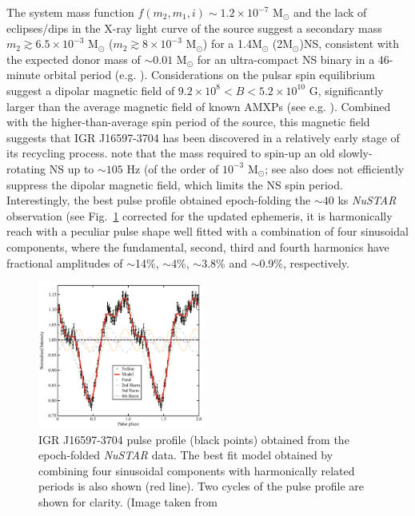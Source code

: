 \documentclass[graybox]{svmult}
\def \nustar{{\em NuSTAR\xspace}}
\begin{document}
The system mass function $f(m_2 ,m_1 ,i)\sim 1.2\times 10^{-7}$ M$_\odot$ and the lack of eclipses/dips in the X-ray light curve of the source suggest a secondary mass $m_2\gtrsim6.5\times 10^{-3}$ M$_\odot$ ($m_2\gtrsim8\times 10^{-3}$ M$_\odot$) for a 1.4M$_\odot$ (2M$_
\odot$)NS, consistent with the expected donor mass of $\sim0.01$ M$_\odot$ for an ultra-compact NS binary in a 46-minute orbital period (e.g. \cite{vanHaaften2012}). Considerations on the pulsar spin equilibrium suggest a dipolar magnetic field of $9.2\times 10^{8} < B < 5.2\times 10^{10}$ G, significantly larger than the average magnetic field of known AMXPs (see e.g. \cite{Mukherjee2015, Degenaar2017}). Combined with the higher-than-average spin period of the source, this magnetic field suggests that IGR J16597-3704 has been discovered in a relatively early stage of its recycling process. \cite{Sanna2018a} note that the mass required to spin-up an old slowly-rotating NS up to $\sim105$ Hz (of the order of $10^{-3}$ M$_\odot$; see also \cite{Burderi1999} does not efficiently suppress the dipolar magnetic field, which limits the NS spin period.
Interestingly, the best pulse profile obtained epoch-folding the $\sim40$ ks \nustar{} observation (see Fig.~\ref{fig:16597} corrected for the updated ephemeris, it is harmonically reach with a peculiar pulse shape well fitted with a combination of four sinusoidal components, where the fundamental, second, third and fourth harmonics have fractional amplitudes of $\sim$14\%, $\sim$4\%, $\sim$3.8\% and $\sim$0.9\%, respectively. 
\begin{figure}
\centering
  \includegraphics[width=0.49\textwidth]{REVIEW_AMXP/pulse_profile_nustar_latest2.pdf}
  \caption{IGR J16597-3704 pulse profile (black points) obtained from the epoch-folded \nustar{} data. The best fit model obtained by combining four sinusoidal components with harmonically related periods is also shown (red line).  
Two cycles of the pulse profile are shown for clarity. (Image taken from \cite{Sanna2018a}}     
\label{fig:16597}
\end{figure}
\end{document}

